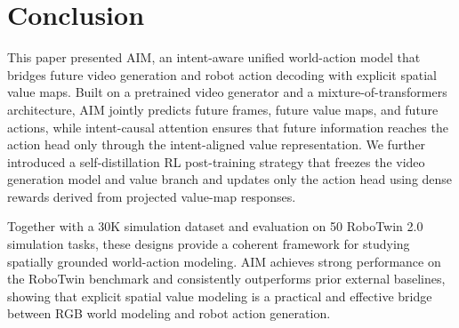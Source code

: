 \documentclass{article}
\newcommand{\method}{AIM\xspace}
\newcommand{\mot}{mixture-of-transformers\xspace}
\begin{document}
\section{Conclusion}
This paper presented \method, an intent-aware unified world-action model that bridges future video generation and robot action decoding with explicit spatial value maps. Built on a pretrained video generator and a \mot architecture, \method jointly predicts future frames, future value maps, and future actions, while intent-causal attention ensures that future information reaches the action head only through the intent-aligned value representation. We further introduced a self-distillation RL post-training strategy that freezes the video generation model and value branch and updates only the action head using dense rewards derived from projected value-map responses.

Together with a 30K simulation dataset and evaluation on 50 RoboTwin 2.0~\cite{robotwin2.0} simulation tasks, these designs provide a coherent framework for studying spatially grounded world-action modeling. AIM achieves strong performance on the RoboTwin benchmark and consistently outperforms prior external baselines, showing that explicit spatial value modeling is a practical and effective bridge between RGB world modeling and robot action generation.
\clearpage


\end{document}
